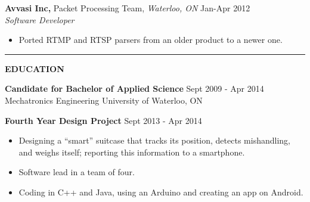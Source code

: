 \documentclass{letter}
\begin{document}
{\bf Avvasi Inc,} Packet Processing Team, {\sl Waterloo, ON} \hfill Jan-Apr 2012 \\
{\sl Software Developer}
\begin{itemize}
  \item Ported RTMP and RTSP parsers from an older product to a newer one.
\end{itemize}

\vskip 2pt
\hrule
{\large\bf EDUCATION}

{\bf Candidate for Bachelor of Applied Science} \hfill Sept 2009 - Apr 2014 \\
Mechatronics Engineering \hfill University of Waterloo, ON

{\bf Fourth Year Design Project} \hfill Sept 2013 - Apr 2014
\begin{itemize}
  \item Designing a ``smart'' suitcase that tracks its position, detects mishandling, and weighs itself; reporting this information to a smartphone.
  \item Software lead in a team of four.
  \item Coding in C++ and Java, using an Arduino and creating an app on Android.
\end{itemize}
\end{document}
